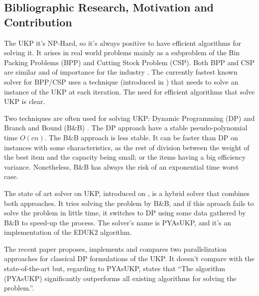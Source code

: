 \documentclass[runningheads,a4paper]{llncs}
\begin{document}
\subsection{Bibliographic Research, Motivation and Contribution}

The UKP it's NP-Hard, so it's always positive to have efficient algorithms for solving it. It arises in real world problems mainly as a subproblem of the Bin Packing Problems (BPP) and Cutting Stock Problem (CSP). Both BPP and CSP are similar and of importance for the industry \cite{survey2014}\cite{gg-1}\cite{gg-2}. The currently fastest known solver for BPP/CSP\cite{survey2014}\cite{belov} uses a technique (introduced in \cite{gg-1}) that needs to solve an instance of the UKP at each iteration. The need for efficient algorithms that solve UKP is clear.

Two techniques are often used for solving UKP: Dynamic Programming (DP) \cite{gar72}\cite{CEDUK}\cite{CTCHU} and Branch and Bound (B\&B) \cite{CMTU2}. The DP approach have a stable pseudo-polynomial time \(O(c n)\). The B\&B approach is less stable. It can be faster than DP on instances with some characteristics, as the rest of division between the weight of the best item and the capacity being small; or the items having a big efficiency variance. Nonetheless, B\&B has always the risk of an exponential time worst case.

The state of art solver on UKP, introduced on \cite{CPYA}, is a hybrid solver that combines both approaches. It tries solving the problem by B\&B, and if this aproach fails to solve the problem in little time, it switches to DP using some data gathered by B\&B to speed-up the process. The solver's name is PYAsUKP, and it's an implementation of the EDUK2 algorithm.%

The recent paper \cite{CMUL} proposes, implements and compares two parallelization approaches for classical DP formulations of the UKP. It doesn't compare with the state-of-the-art but, regarding to PYAsUKP, states that ``The algorithm (PYAsUKP) significantly outperforms all existing algorithms for solving the problem.''.
\end{document}
